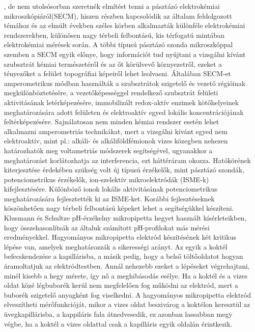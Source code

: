 {, de nem utolsósorban szeretnék elmítést tenni a pásztázó elektrokémiai mikroszkópiáról(SECM), hiszen részben kapcsolódik az általam feldolgozott témához és az elmúlt években széles körben alkalmazták különféle elektrokémiai rendszerekben, különösen nagy térbeli felbontású, kis térfogatú mintában elektrokémiai mérések során. A többi típusú pásztázó szonda mikroszkóppal szemben a SECM egyik előnye, hogy információt tud nyújtani a  vizsgálni kívánt szubsztrát kémiai természetéről és az őt körülvevő környezetről, ezeket a tényezőket a felület topográfiai képeiről lehet leolvasni. Általában SECM-et amperometrikus módban használták a szubsztrátok szigetelő és vezető régióinak megkülönböztetésére, a vezetőképességgel rendelkező szubsztrát felületi aktivitásának letérképezésére, immobilizált redox-aktív enzimek kötőhelyeinek meghatározására adott felületen és elektroaktív egyed lokális koncentrációjának feltérképezésére. Sajnálatosan nem minden kémiai rendszer esetén lehet alkalmazni amperometriás technikákat, mert a vizsgálni kívánt egyed nem elektroaktív, mint pl.: alkáli- és alkáliföldfémionok vizes közegben nehezen határozhatók meg voltametriás módszerek segítségével, ugyanakkor a meghatározást korlátozhatja az interferencia, ezt háttéráram okozza. Hatókörének kiterjesztése érdekében szükség volt új típusú érzékelők, mint pásztázó szondák, potenciometrikus érzékelők, ion-szelektív mikroelektródák (ISME-k) kifejlesztésére. Különböző ionok lokális aktivitásának potenciometrikus meghatározására fejlesztették ki az ISME-ket.
 Korábbi fejlesztéseknek köszönhetően nagy térbeli felbontású képeket lehet  a segítségükkel készíteni. Klusmann és Schultze pH-érzékelny mikropipetta hegyet használt kísérleteikben, hogy összehasonlítsák az általuk számított pH-profilokat más mérési eredményekkel. Hagyományos mikropipetta elektród készítésének két kritikus lépése van, amelyek meghatározzák a sikerességi arányt. Az egyik a koktél befecskendezése a kapillárisba, a másik pedig, hogy a belső töltőoldatot hogyan áramoltatjuk az elektródtestben. Annál nehezebb ezeket a lépéseket végrehajtani, minél kisebb a hegy mérete, így nő a meghibásodás esélye. Ha a koktél és a vizes oldat közé légbuborék kerül nem megfelelően fog működni az elektród, mert a buborék szigetelő anyagként fog viselkedni. A hagyományos mikropipetta elektród elveszítheti mérőfunkcióját, mikor a vizes oldat beszivárog a koktélon keresztül az üvegkapillárisba, a kappiláris fala átnedvesedik, ez azonban lassabban megy végbe, ha a koktél a vizes oldattal csak a kapilláris egyik oldalán érintkezik. }
